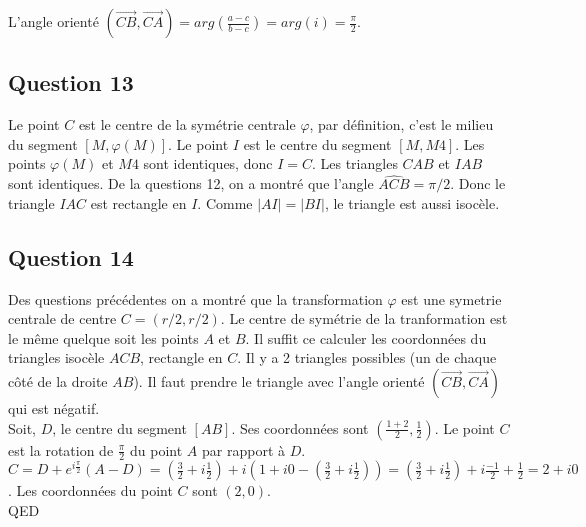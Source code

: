 \documentclass[]{book}
\theoremstyle{definition}
\begin{document}
L'angle orient\'e $(\overrightarrow{CB}, \overrightarrow{CA}) = arg(\frac{a-c}{b-c}) = arg(i) = \frac{\pi}{2}$.


\subsection*{Question 13}
Le point $C$ est le centre de la sym\'etrie centrale $\varphi$, par d\'efinition, c'est le milieu du segment $[M,\varphi(M)]$. Le point $I$ est le centre du segment $[M, M4]$. Les points $\varphi(M)$ et $M4$ sont identiques, donc $I=C$. Les triangles $CAB$ et $IAB$ sont identiques. De la questions 12, on a montr\'e que l'angle $\widehat{ACB} = \pi/2$. Donc le triangle $IAC$ est rectangle en $I$. Comme $|AI|=|BI|$, le triangle est aussi isoc\`ele. 

\subsection*{Question 14}
Des questions pr\'ec\'edentes on a montr\'e que la transformation $\varphi$ est une symetrie centrale de centre $C = (r/2, r/2)$. Le centre de sym\'etrie de la tranformation est le m\^eme quelque soit les points $A$ et $B$. Il suffit ce calculer les coordonn\'ees du triangles isoc\`ele $ACB$, rectangle en $C$. Il y a 2 triangles possibles (un de chaque c\^ot\'e de la droite $AB$). Il faut prendre le triangle avec l'angle orient\'e $(\overrightarrow{CB}, \overrightarrow{CA})$ qui est n\'egatif.\\

Soit, $D$, le centre du segment $[AB]$. Ses coordonn\'ees sont $(\frac{1+2}{2}, \frac{1}{2})$. Le point $C$ est la rotation de $\frac{\pi}{2}$ du point $A$ par rapport \`a $D$. $C = D + e^{i\frac{\pi}{2}}(A-D) = (\frac{3}{2} + i\frac{1}{2}) + i(1+i0-(\frac{3}{2} + i\frac{1}{2})) = (\frac{3}{2} + i\frac{1}{2})+ i\frac{-1}{2} + \frac{1}{2} = 2 + i0$. Les coordonn\'ees du point $C$ sont $(2,0)$.
\\

QED
\end{document}
